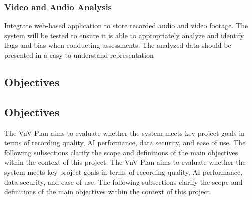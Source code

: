 \documentclass[12pt, titlepage]{article}
\begin{document}
  \subsubsection{Video and Audio Analysis}

  Integrate web-based application to store recorded audio and video footage. The system will be tested to ensure it is able to 
  appropriately analyze and identify flags and bias when conducting assessments. The analyzed data should be presented 
  in a easy to understand representation

  \subsection{Objectives}
  \subsection{Objectives}

The VnV Plan aims to evaluate whether the system meets key project goals in terms of recording quality, AI performance, data security, and ease of use. The following subsections clarify the scope and definitions of the main objectives within the context of this project.
The VnV Plan aims to evaluate whether the system meets key project goals in terms of recording quality, AI performance, data security, and ease of use. The following subsections clarify the scope and definitions of the main objectives within the context of this project.
\end{document}
